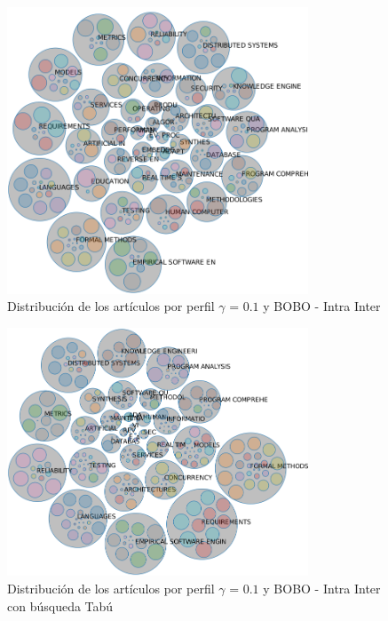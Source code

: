 \begin{figure}[H]
  \centering
    \includegraphics[width=0.8\textwidth]{resultados/papers/BOBO/INTRA_INTER/bubbles-gamma-01.png}
  \caption{Distribución de los artículos por perfil $\gamma$ = $0.1$ y BOBO - Intra Inter}
  \label{res:img-papers-bubbles-gamma01-bobo-intra-inter}
\end{figure}

\begin{figure}[H]
  \centering
    \includegraphics[width=0.8\textwidth]{resultados/papers/BOBO/INTRA_INTER/bubbles-gamma-with-local-01.png}
  \caption{Distribución de los artículos por perfil $\gamma$ = $0.1$ y BOBO - Intra Inter con búsqueda Tabú}
  \label{res:img-papers-bubbles-gamma01-hac-intra-inter-bobo}
\end{figure}

